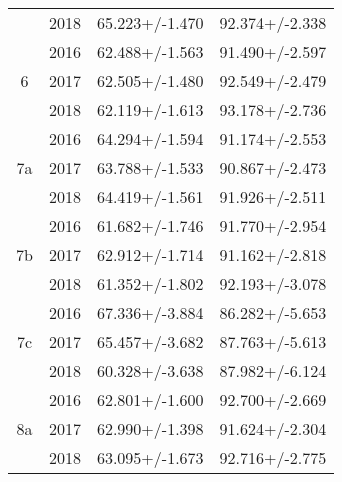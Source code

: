 \begin{table}
\begin{tabular}{cccc}
   & 2018 &       65.223+/-1.470 &        92.374+/-2.338 \\
\cline{1-4}
\multirow{3}{*}{6} & 2016 &       62.488+/-1.563 &        91.490+/-2.597 \\
   & 2017 &       62.505+/-1.480 &        92.549+/-2.479 \\
   & 2018 &       62.119+/-1.613 &        93.178+/-2.736 \\
\cline{1-4}
\multirow{3}{*}{7a} & 2016 &       64.294+/-1.594 &        91.174+/-2.553 \\
   & 2017 &       63.788+/-1.533 &        90.867+/-2.473 \\
   & 2018 &       64.419+/-1.561 &        91.926+/-2.511 \\
\cline{1-4}
\multirow{3}{*}{7b} & 2016 &       61.682+/-1.746 &        91.770+/-2.954 \\
   & 2017 &       62.912+/-1.714 &        91.162+/-2.818 \\
   & 2018 &       61.352+/-1.802 &        92.193+/-3.078 \\
\cline{1-4}
\multirow{3}{*}{7c} & 2016 &       67.336+/-3.884 &        86.282+/-5.653 \\
   & 2017 &       65.457+/-3.682 &        87.763+/-5.613 \\
   & 2018 &       60.328+/-3.638 &        87.982+/-6.124 \\
\cline{1-4}
\multirow{3}{*}{8a} & 2016 &       62.801+/-1.600 &        92.700+/-2.669 \\
   & 2017 &       62.990+/-1.398 &        91.624+/-2.304 \\
   & 2018 &       63.095+/-1.673 &        92.716+/-2.775 \\
\bottomrule
\end{tabular}
\end{table}
